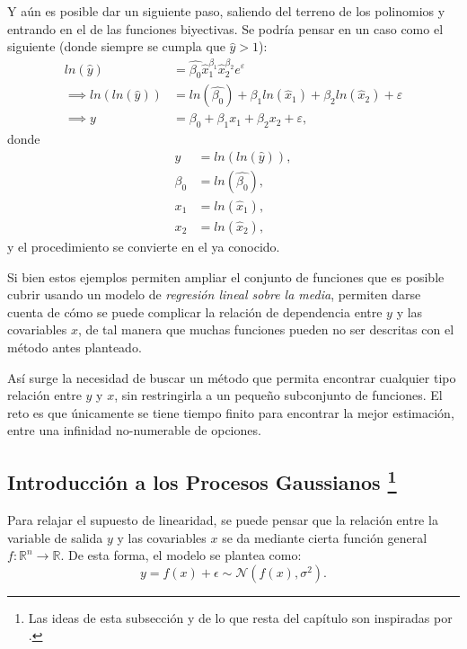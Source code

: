 Y a\'un es posible dar un siguiente paso, saliendo del terreno de los polinomios y entrando en el de las funciones biyectivas. Se podr\'ia pensar en un caso como el siguiente (donde siempre se cumpla que $\hat{y} > 1$):
\begin{equation*}
\begin{aligned}
    ln(\hat{y}) &= \hat{\beta_0}\hat{x}_1^{\beta_1}\hat{x}_2^{\beta_2} e^{\varepsilon} \\
    \implies ln(ln(\hat{y})) &= ln(\hat{\beta_0}) + \beta_1 ln(\hat{x}_1) + \beta_2 ln(\hat{x}_2) + \varepsilon \\
    \implies y &= \beta_0 + \beta_1 x_1 + \beta_2 x_2 + \varepsilon, 
\end{aligned}
\end{equation*}
donde
\begin{equation*}
\begin{aligned}
    y &= ln(ln(\hat{y})), \\
    \beta_0 &= ln(\hat{\beta_0}), \\
    x_1 &= ln(\hat{x}_1), \\
    x_2 &= ln(\hat{x}_2),
\end{aligned}
\end{equation*}
y el procedimiento se convierte en el ya conocido.

Si bien estos ejemplos permiten ampliar el conjunto de funciones que es posible cubrir usando un modelo de \textit{regresi\'on lineal sobre la media}, permiten darse cuenta de c\'omo se puede complicar la relaci\'on de dependencia entre $y$ y las covariables $x$, de tal manera que muchas funciones pueden no ser descritas con el m\'etodo antes planteado.

As\'i surge la necesidad de buscar un m\'etodo que permita encontrar cualquier tipo relaci\'on entre $y$ y $x$, sin restringirla a un pequeño subconjunto de funciones. El reto es que \'unicamente se tiene tiempo finito para encontrar la mejor estimaci\'on, entre una infinidad no-numerable de opciones.

\subsection[Introducci\'on a los Procesos Gaussianos]{
    Introducci\'on a los Procesos Gaussianos
    \footnote{Las ideas de esta subsecci\'on y de lo que resta del cap\'itulo son inspiradas por \cite{Rasmussen_GauProc}.}
}

Para relajar el supuesto de linearidad, se puede pensar que la relación entre la variable de salida $y$ y las covariables $x$ se da mediante cierta función general $f: \mathbb{R}^n \rightarrow \mathbb{R}$. De esta forma, el modelo se plantea como:
\begin{equation*}
    y = f(x) + \epsilon \sim \mathcal{N}(f(x),\sigma^2).
\end{equation*}

